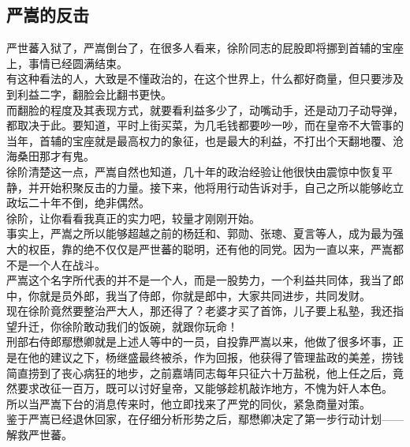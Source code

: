 	\begin{multicols}{\theparacolNo}
\fi
\subsection{严嵩的反击}
严世蕃入狱了，严嵩倒台了，在很多人看来，徐阶同志的屁股即将挪到首辅的宝座上，事情已经圆满结束。\\

有这种看法的人，大致是不懂政治的，在这个世界上，什么都好商量，但只要涉及到利益二字，翻脸会比翻书更快。\\

而翻脸的程度及其表现方式，就要看利益多少了，动嘴动手，还是动刀子动导弹，都取决于此。要知道，平时上街买菜，为几毛钱都要吵一吵，而在皇帝不大管事的当年，首辅的宝座就是最高权力的象征，也是最大的利益，不打出个天翻地覆、沧海桑田那才有鬼。\\

徐阶清楚这一点，严嵩自然也知道，几十年的政治经验让他很快由震惊中恢复平静，并开始积聚反击的力量。接下来，他将用行动告诉对手，自己之所以能够屹立政坛二十年不倒，绝非偶然。\\

徐阶，让你看看我真正的实力吧，较量才刚刚开始。\\

事实上，严嵩之所以能够超越之前的杨廷和、郭勋、张璁、夏言等人，成为最为强大的权臣，靠的绝不仅仅是严世蕃的聪明，还有他的同党。因为一直以来，严嵩都不是一个人在战斗。\\

严嵩这个名字所代表的并不是一个人，而是一股势力，一个利益共同体，我当了郎中，你就是员外郎，我当了侍郎，你就是郎中，大家共同进步，共同发财。\\

现在徐阶竟然要整治严大人，那还得了？老婆才买了首饰，儿子要上私塾，我还指望升迁，你徐阶敢动我们的饭碗，就跟你玩命！\\

刑部右侍郎鄢懋卿就是上述人等中的一员，自投靠严嵩以来，他做了很多坏事，正是在他的建议之下，杨继盛最终被杀，作为回报，他获得了管理盐政的美差，捞钱简直捞到了丧心病狂的地步，之前嘉靖同志每年只征六十万盐税，他上任之后，竟然要求改征一百万，既可以讨好皇帝，又能够趁机敲诈地方，不愧为奸人本色。\\

所以当严嵩下台的消息传来时，他立即找来了严党的同伙，紧急商量对策。\\

鉴于严嵩已经退休回家，在仔细分析形势之后，鄢懋卿决定了第一步行动计划——解救严世蕃。\\


\end{multicols}
